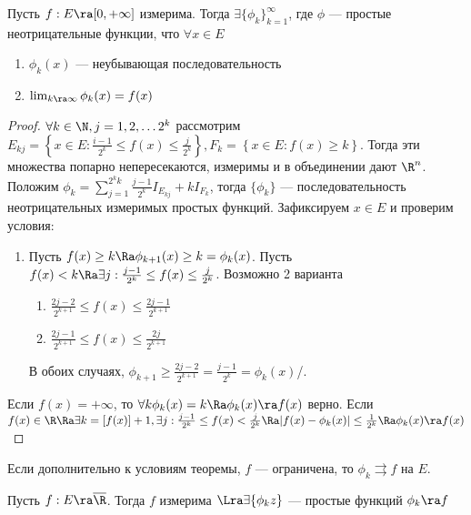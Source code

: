 \begin{theorem}
    Пусть \(f: E \ra [0, +\infty]\) измерима. Тогда \(\exists \{\phi_k\}_{k = 1}^\infty\), где \(\phi\) --- простые неотрицательные функции, что \(\forall x \in E\)
    \begin{enumerate}
        \item \(\phi_k(x)\) --- неубывающая последовательность
        \item \(\lim_{k \ra \infty} \phi_k(x) = f(x)\)
    \end{enumerate}
\end{theorem}
\begin{proof}
    \(\forall k \in \N, j = 1, 2, \dots 2^k\) рассмотрим \(E_{kj} = \left\{x \in E: \frac{i - 1}{2^k} \le f(x) \le \frac{j}{2^k}\right\}, F_k = \left\{x \in E: f(x) \ge k\right\} \). Тогда эти множества попарно непересекаются, измеримы и в объединении дают \(\R^n\). Положим \(\phi_k = \sum_{j = 1}^{2^kk} \frac{j - 1}{2^k}I_{E_{kj}} +  kI_{F_k}\), тогда \(\{\phi_k\}\) --- последовательность неотрицательных измеримых простых функций. Зафиксируем \(x\in E\) и проверим условия:
    \begin{enumerate}
        \item Пусть \(f(x) \ge k \Ra \phi_{k + 1}(x) \ge k = \phi_k(x)\). Пусть \(f(x) < k \Ra \exists j: \frac{j - 1}{2^k} \le f(x) \le \frac{j}{2^k}\). Возможно 2 варианта
        \begin{enumerate}
            \item \(\frac{2j - 2}{2^{k + 1}} \le f(x) \le \frac{2j - 1}{2^{k + 1}}\)
            \item \(\frac{2j - 1}{2^{k + 1}} \le f(x) \le \frac{2j}{2^{k + 1}}\)
        \end{enumerate}
        В обоих случаях, \(\phi_{k + 1} \ge \frac{2j - 2}{2^{k + 1}} = \frac{j - 1}{2^k} = \phi_k(x)\)/.
    \end{enumerate}
    \item Если \(f(x) = +\infty\), то \(\forall k \phi_k(x) = k \Ra \phi_k(x) \ra f(x)\) верно. Если \(f(x) \in \R \Ra \exists k = [f(x)] + 1, \exists j: \frac{j - 1}{2^k} \le f(x) < \frac{j}{2^k} \Ra |f(x) - \phi_k(x)| \le \frac{1}{2^k} \Ra \phi_k(x) \ra f(x)\)
\end{proof}

\begin{note}
    Если дополнительно к условиям теоремы, \(f\) --- ограничена, то \(\phi_k \rightrightarrows f\) на \(E\).
\end{note}

\begin{corollary}
    Пусть \(f: E \ra \overline{\R}\). Тогда \(f\) измерима \(\Lra \exists \{\phi_kz\}\) --- простые функций \(\phi_k \ra f\)
\end{corollary}